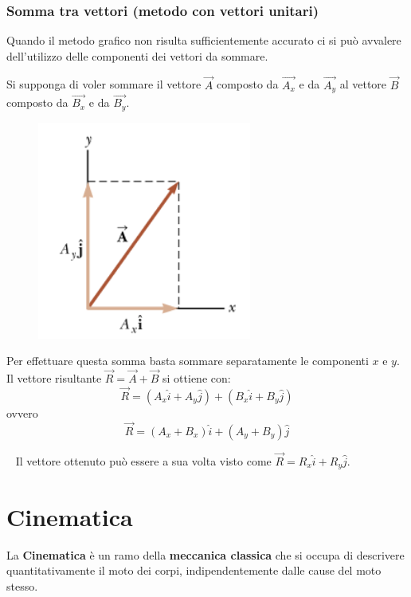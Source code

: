 \documentclass[a4paper,11pt,oneside]{book}
\begin{document}
\subsection{Somma tra vettori (metodo con vettori unitari)}
Quando il metodo grafico non risulta sufficientemente accurato ci si può avvalere dell'utilizzo delle componenti dei vettori da sommare.

Si supponga di voler sommare il vettore $\vec{A}$ composto da $\vec{A_x}$ e da $\vec{A_y}$ al vettore $\vec{B}$
composto da $\vec{B_x}$ e da $\vec{B_y}$.

\begin{figure}[h]
    \includegraphics[scale=0.5]{vettori_unitari}
    \centering
\end{figure}

\noindent Per effettuare questa somma basta sommare separatamente le componenti $x$ e $y$. Il vettore risultante $\vec{R} = \vec{A} + \vec{B}$
si ottiene con:
\begin{equation*}
    \vec{R} = (A_x \hat{i} + A_y \hat{j}) + (B_x \hat{i} + B_y \hat{j})
\end{equation*}
ovvero
\begin{equation*}
    \vec{R} = (A_x+ B_x) \hat{i} + (A_y + B_y) \hat{j}
\end{equation*}

~\newline
\noindent Il vettore ottenuto può essere a sua volta visto come $\vec{R} = R_x \hat{i} + R_y \hat{j}$.



\chapter{Cinematica}

La \textbf{Cinematica} è un ramo della \textbf{meccanica classica} che si occupa di descrivere quantitativamente il moto dei corpi, indipendentemente dalle cause del moto stesso.
\end{document}
